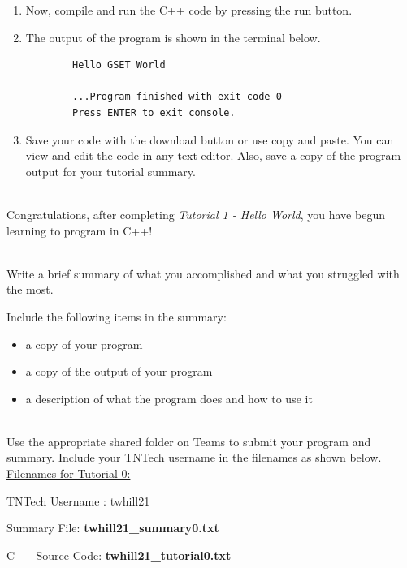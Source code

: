 \documentclass[12pt]{article}
\begin{document}
\begin{description}[labelindent=1cm]
\begin{enumerate}
		\item Now, compile and run the C++ code by pressing the run button.
		
		\item	
		The output of the program is shown in the terminal below.
		\begin{verbatim} 
		Hello GSET World
		
		...Program finished with exit code 0
		Press ENTER to exit console.
		\end{verbatim}
	
		\item Save your code with the download button or use copy and paste. You can view and edit the code in any text editor. Also, save a copy of the program output for your tutorial summary. 

	\end{enumerate}

\item[\textbf{\underline{Tutorial Complete:}}] \hfill \vspace{3mm}\\ 
	Congratulations, after completing {\it Tutorial 1 - Hello World}, you have begun learning to program in C++! \\


\newpage
\item[\textbf{\underline{Tutorial Summary:}}] \hfill \vspace{3mm}\\ 
Write a brief summary of what you accomplished and what you struggled with the most. 

Include the following items in the summary:
\begin{itemize}

\item a copy of your program
\item a copy of the output of your program
\item a description of what the program does and how to use it

\end{itemize}


\item[\textbf{\underline{Submission on Teams:}}] \hfill \vspace{3mm}\\ 
Use the appropriate shared folder on Teams to submit your program and summary. Include your TNTech username in the filenames as shown below. \vspace{3mm}\\

\underline{Filenames for Tutorial 0:}

TNTech Username : twhill21

Summary File: \textbf{ twhill21\_summary0.txt}

C++ Source Code: \textbf{ twhill21\_tutorial0.txt}





\end{description}
\end{document}
